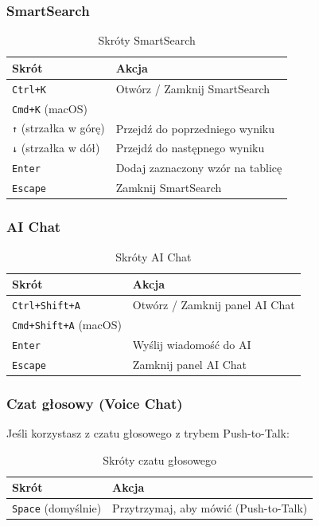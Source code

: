 \documentclass[12pt,a4paper]{article}
\begin{document}
\subsubsection{SmartSearch}

\begin{table}[H]
\centering
\begin{tabular}{|l|l|}
\hline
\textbf{Skrót} & \textbf{Akcja} \\
\hline
\texttt{Ctrl+K} & Otwórz / Zamknij SmartSearch \\
\texttt{Cmd+K} (macOS) & \\
\hline
\texttt{↑} (strzałka w górę) & Przejdź do poprzedniego wyniku \\
\hline
\texttt{↓} (strzałka w dół) & Przejdź do następnego wyniku \\
\hline
\texttt{Enter} & Dodaj zaznaczony wzór na tablicę \\
\hline
\texttt{Escape} & Zamknij SmartSearch \\
\hline
\end{tabular}
\caption{Skróty SmartSearch}
\end{table}

\subsubsection{AI Chat}

\begin{table}[H]
\centering
\begin{tabular}{|l|l|}
\hline
\textbf{Skrót} & \textbf{Akcja} \\
\hline
\texttt{Ctrl+Shift+A} & Otwórz / Zamknij panel AI Chat \\
\texttt{Cmd+Shift+A} (macOS) & \\
\hline
\texttt{Enter} & Wyślij wiadomość do AI \\
\hline
\texttt{Escape} & Zamknij panel AI Chat \\
\hline
\end{tabular}
\caption{Skróty AI Chat}
\end{table}

\subsubsection{Czat głosowy (Voice Chat)}

Jeśli korzystasz z czatu głosowego z trybem Push-to-Talk:

\begin{table}[H]
\centering
\begin{tabular}{|l|l|}
\hline
\textbf{Skrót} & \textbf{Akcja} \\
\hline
\texttt{Space} (domyślnie) & Przytrzymaj, aby mówić (Push-to-Talk) \\
\hline
\end{tabular}
\caption{Skróty czatu głosowego}
\end{table}
\end{document}
